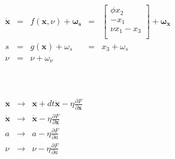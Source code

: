 \documentclass{standalone}
\begin{document}
\huge

\begin{minipage}[t]{15cm}
\begin{minipage}[t]{15cm}
$
\begin{array}{rllll}
    \dot{\mathbf{x}} &=& f(\boldsymbol{x}, \nu) + \boldsymbol{\omega_s} &=&
    \left[\begin{array}{c}
        \phi x_2 \\
        -x_1 \\
        \nu x_1 - x_3 \\
    \end{array}\right] +\boldsymbol{\omega_x}\\
    s &=& g(\boldsymbol{x}) + \omega_s &=& x_3 + \omega_s \\
    \nu &=& \nu + \omega_{\nu}&&\\
\end{array}
$
\end{minipage}
\vspace{0.1in}
\\
\begin{minipage}[t]{15cm}
$
\begin{array}{ccl}
    \boldsymbol{x} &\rightarrow& \boldsymbol{x} + dt\boldsymbol{\dot{x}}
    -\eta\frac{\partial F}{\partial \boldsymbol{x}} \\
    \boldsymbol{\dot{x}} &\rightarrow& \boldsymbol{\dot{x}}
    -\eta\frac{\partial F}{\partial \boldsymbol{\dot{x}}} \\
    a &\rightarrow& a -\eta\frac{\partial F}{\partial a} \\
    \nu &\rightarrow& \nu -\eta\frac{\partial F}{\partial a} \\
\end{array}
$
\end{minipage}
\end{minipage}
\end{document}
